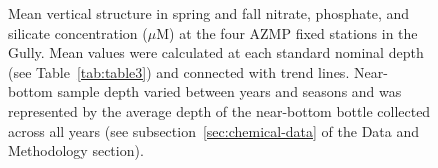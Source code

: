 \documentclass[12pt]{article}\usepackage[]{graphicx}\usepackage[]{color}
\begin{document}
\begin{landscapepage}
\begin{figure}[htb]

{\centering {} 

}

\caption{Mean vertical structure in spring and fall nitrate, phosphate, and silicate concentration (\(\mu\)M) at the four AZMP fixed stations in the Gully. Mean values were calculated at each standard nominal depth (see Table~\ref{tab:table3}) and connected with trend lines. Near-bottom sample depth varied between years and seasons and was represented by the average depth of the near-bottom bottle collected across all years (see subsection~\ref{sec:chemical-data} of the Data and Methodology section).}\label{fig:figure17}
\end{figure}
\end{landscapepage}
\clearpage
\end{document}
